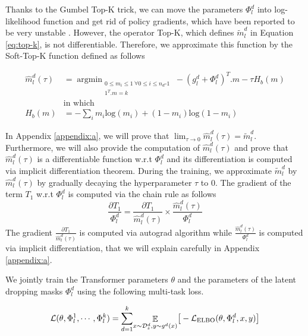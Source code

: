 \documentclass[11pt]{article}
\begin{document}
Thanks to the Gumbel Top-K trick, we can move the parameters $\Phi_l^d$ into log-likelihood function and get rid of policy gradients, which have been reported to be very unstable \citep{Diederick14auto}. However, the operator Top-K, which defines $\tilde{m}_l^d$ in Equation \eqref{eq:top-k}, is not differentiable. Therefore, we approximate this function by the Soft-Top-K function defined as follows

\begin{align}
\hat{m}_l^d(\tau) &= \displaystyle{\mathop{argmin}_{\substack{
       0 \leqslant m_i \leqslant 1 \ \forall 0 \leqslant i \leqslant n_d\text{-}1 \label{eq:soft-top-k}\\
        1^{T}.m = k
      }}} -(g_l^d+\Phi_l^d)^{T} . m - \tau H_b(m) \\
& \text{in which} \nonumber \\
H_b(m) &= - \sum_i m_i \text{log}(m_i) + (1-m_i)\text{log}(1-m_i) \nonumber 
\end{align}

In Appendix \ref{appendix:a}, we will prove that $\lim_{\tau \rightarrow 0}\hat{m}_l^d(\tau) = \tilde{m}_l^d$. Furthermore, we will also provide the computation of $\hat{m}_l^d(\tau)$ and prove that $\hat{m}_l^d(\tau)$ is a differentiable function w.r.t $\Phi_l^d$ and its differentiation is computed via implicit differentiation theorem. During the training, we approximate $\tilde{m}_l^d$ by $\hat{m}_l^d(\tau)$ by gradually decaying the hyperparameter $\tau$ to $0$. The gradient of the term $T_1$ w.r.t $\Phi_l^d$ is computed via the chain rule as follows
\begin{equation}
\frac{\partial T_1}{\Phi_l^d} = \frac{\partial T_1}{\hat{m}_l^d(\tau)} \times \frac{\hat{m}_l^d(\tau)}{\Phi_l^d}
\end{equation}
The gradient $\frac{\partial T_1}{\hat{m}_l^d(\tau)}$ is computed via autograd algorithm while $\frac{\hat{m}_l^d(\tau)}{\Phi_l^d}$ is computed via implicit differentiation, that we will explain carefully in Appendix \ref{appendix:a}.

We jointly train the Transformer parameters $\theta$ and the parameters of the latent dropping masks $\Phi_l^d$ using the following multi-task loss.

\begin{align}
\hspace{-0.em}
\mathcal{L}(\theta,\Phi_l^1,\cdots,\Phi_l^k) = \displaystyle{\mathop{\sum}_{d=1}^{k}} \displaystyle{\mathop{\mathbb{E}}_{x \sim \mathcal{D}_s^d,y \sim g^d(x)}} \big[-\mathcal{L}_{\text{ELBO}}(\theta,\Phi_l^d,x,y)\big]
\end{align}
\end{document}
